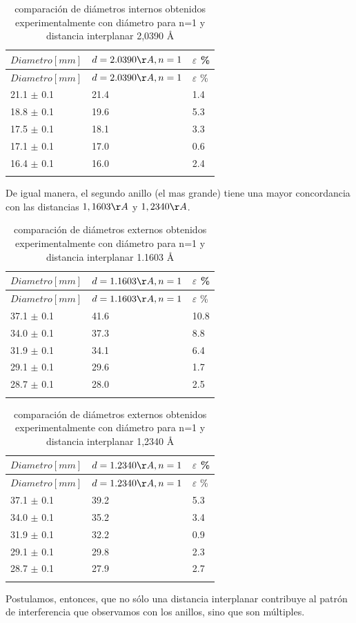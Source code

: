 \documentclass[]{article}
\begin{document}
\begin{longtable}[]{@{}lll@{}}
\toprule
\(Diametro[mm]\) & \(d=2.0390 \AA, n=1\) & \(\varepsilon\)
\%\tabularnewline
\midrule
\endfirsthead
\toprule
\(Diametro[mm]\) & \(d=2.0390 \AA, n=1\) & \(\varepsilon\)
\%\tabularnewline
\midrule
\endhead
21.1 \(\pm\) 0.1 & 21.4 & 1.4\tabularnewline
18.8 \(\pm\) 0.1 & 19.6 & 5.3\tabularnewline
17.5 \(\pm\) 0.1 & 18.1 & 3.3\tabularnewline
17.1 \(\pm\) 0.1 & 17.0 & 0.6\tabularnewline
16.4 \(\pm\) 0.1 & 16.0 & 2.4\tabularnewline
\bottomrule
\caption{comparación de diámetros internos obtenidos experimentalmente
con diámetro para n=1 y distancia interplanar 2,0390 \AA}\tabularnewline
\end{longtable}

De igual manera, el segundo anillo (el mas grande) tiene una mayor concordancia con
las distancias \(1,1603 \AA\) y \(1,2340 \AA\).

\begin{longtable}[]{@{}lll@{}}
\toprule
\(Diametro[mm]\) & \(d=1.1603 \AA, n=1\) & \(\varepsilon\)
\%\tabularnewline
\midrule
\endfirsthead
\toprule
\(Diametro[mm]\) & \(d=1.1603 \AA, n=1\) & \(\varepsilon\)
\%\tabularnewline
\midrule
\endhead
37.1 \(\pm\) 0.1 & 41.6 & 10.8\tabularnewline
34.0 \(\pm\) 0.1 & 37.3 & 8.8\tabularnewline
31.9 \(\pm\) 0.1 & 34.1 & 6.4\tabularnewline
29.1 \(\pm\) 0.1 & 29.6 & 1.7\tabularnewline
28.7 \(\pm\) 0.1 & 28.0 & 2.5\tabularnewline
\bottomrule
\caption{comparación de diámetros externos obtenidos experimentalmente
con diámetro para n=1 y distancia interplanar 1.1603 \AA}\tabularnewline
\end{longtable}

\begin{longtable}[]{@{}lll@{}}
\toprule
\(Diametro[mm]\) & \(d=1.2340 \AA, n=1\) & \(\varepsilon\)
\%\tabularnewline
\midrule
\endfirsthead
\toprule
\(Diametro[mm]\) & \(d=1.2340 \AA, n=1\) & \(\varepsilon\)
\%\tabularnewline
\midrule
\endhead
37.1 \(\pm\) 0.1 & 39.2 & 5.3\tabularnewline
34.0 \(\pm\) 0.1 & 35.2 & 3.4\tabularnewline
31.9 \(\pm\) 0.1 & 32.2 & 0.9\tabularnewline
29.1 \(\pm\) 0.1 & 29.8 & 2.3\tabularnewline
28.7 \(\pm\) 0.1 & 27.9 & 2.7\tabularnewline
\bottomrule
\caption{comparación de diámetros externos obtenidos experimentalmente
con diámetro para n=1 y distancia interplanar 1,2340 \AA}\tabularnewline
\end{longtable}


Postulamos, entonces, que no sólo una distancia interplanar contribuye
al patrón de interferencia que observamos con los anillos, sino que son
múltiples.
\end{document}
